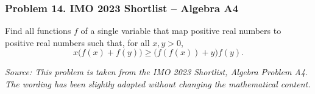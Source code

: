 \subsubsection*{Problem 14. IMO 2023 Shortlist -- Algebra A4}

\begin{exercisebox}[medium]

Find all functions $f$ of a single variable that map
positive real numbers to positive real numbers such that,
for all $x,y>0$,
\[
 x\bigl(f(x)+f(y)\bigr)
 \ge \bigl(f(f(x))+y\bigr)f(y).
\]

\noindent
\textit{Source: This problem is taken from the
IMO 2023 Shortlist, Algebra Problem A4.
The wording has been slightly adapted without
changing the mathematical content.}


\end{exercisebox}